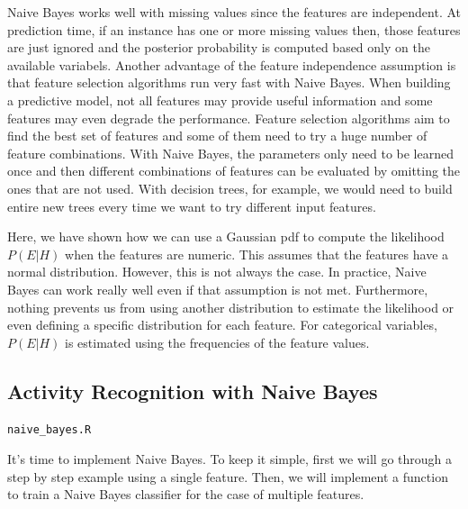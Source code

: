 \documentclass[
  11pt,
]{krantz}
\makeatletter
\newenvironment{kframe}{%
\medskip{}
\setlength{\fboxsep}{.8em}
 \def\at@end@of@kframe{}%
 \ifinner\ifhmode%
  \def\at@end@of@kframe{\end{minipage}}%
  \begin{minipage}{\columnwidth}%
 \fi\fi%
 \def\FrameCommand##1{\hskip\@totalleftmargin \hskip-\fboxsep
 \colorbox{shadecolor}{##1}\hskip-\fboxsep
     \hskip-\linewidth \hskip-\@totalleftmargin \hskip\columnwidth}%
 \MakeFramed {\advance\hsize-\width
   \@totalleftmargin\z@ \linewidth\hsize
   \@setminipage}}%
 {\par\unskip\endMakeFramed%
 \at@end@of@kframe}
\newenvironment{rmdblock}[1]
  {
  \begin{itemize}
  \renewcommand{\labelitemi}{
    \raisebox{-.7\height}[0pt][0pt]{
      {\setkeys{Gin}{width=3em,keepaspectratio}\texttt{[image: images/icons/\#1]}}
    }
  }
  \setlength{\fboxsep}{1em}
  \begin{kframe}
  \item
  }
  {
  \end{kframe}
  \end{itemize}
  }
\newenvironment{rmdinfo}
  {\begin{rmdblock}{info}}
  {\end{rmdblock}}
\newenvironment{rmdfolder}
  {\begin{rmdblock}{folder}}
  {\end{rmdblock}}
\newenvironment{rmdgoodpractice}
  {\begin{rmdblock}{goodpractice}}
  {\end{rmdblock}}
\makeatother
\begin{document}
\begin{rmdgoodpractice}
Naive Bayes works well with missing values since the features are independent. At prediction time, if an instance has one or more missing values then, those features are just ignored and the posterior probability is computed based only on the available variabels. Another advantage of the feature independence assumption is that feature selection algorithms run very fast with Naive Bayes. When building a predictive model, not all features may provide useful information and some features may even degrade the performance. Feature selection algorithms aim to find the best set of features and some of them need to try a huge number of feature combinations. With Naive Bayes, the parameters only need to be learned once and then different combinations of features can be evaluated by omitting the ones that are not used. With decision trees, for example, we would need to build entire new trees every time we want to try different input features.
\end{rmdgoodpractice}

\begin{rmdinfo}
Here, we have shown how we can use a Gaussian pdf to compute the likelihood \(P(E|H)\) when the features are numeric. This assumes that the features have a normal distribution. However, this is not always the case. In practice, Naive Bayes can work really well even if that assumption is not met. Furthermore, nothing prevents us from using another distribution to estimate the likelihood or even defining a specific distribution for each feature. For categorical variables, \(P(E|H)\) is estimated using the frequencies of the feature values.
\end{rmdinfo}

\hypertarget{activity-recognition-with-naive-bayes}{%
\subsection{Activity Recognition with Naive Bayes}\label{activity-recognition-with-naive-bayes}}

\begin{rmdfolder}
\texttt{naive\_bayes.R}
\end{rmdfolder}

It's time to implement Naive Bayes. To keep it simple, first we will go through a step by step example using a single feature. Then, we will implement a function to train a Naive Bayes classifier for the case of multiple features.
\end{document}
